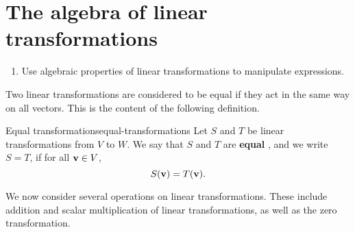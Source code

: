 \section{The algebra of linear transformations}

\begin{outcome}
  \begin{enumerate}
  \item Use algebraic properties of linear transformations to
    manipulate expressions.
  \end{enumerate}
\end{outcome}

Two linear transformations are considered to be equal if they act in
the same way on all vectors. This is the content of the following
definition.

\begin{definition}{Equal transformations}{equal-transformations}
  Let $S$ and $T$ be linear transformations from $V$ to $W$. We say
  that $S$ and $T$ are \textbf{equal}%
  , and we write $S = T$, if
  for all $\mbox{\bf v}\in V$,
  \begin{equation*}
    S(\mbox{\bf v}) = T(\mbox{\bf v}).
  \end{equation*}
\end{definition}

We now consider several operations on linear transformations. These
include addition and scalar multiplication of linear transformations,
as well as the zero transformation.

